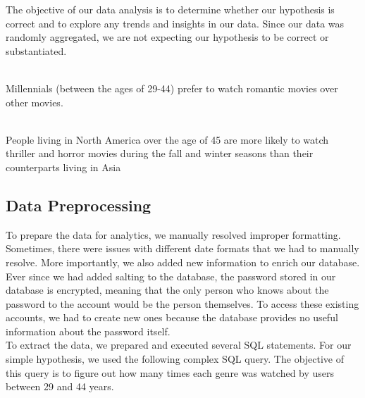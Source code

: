 \documentclass[12pt]{article}
\begin{document}
The objective of our data analysis is to determine whether our hypothesis is correct and to explore any trends and insights in our data. Since our data was randomly aggregated, we are not expecting our hypothesis to be correct or substantiated.\\
\\

Millennials (between the ages of 29-44) prefer to watch romantic movies over other movies.\\
\\

People living in North America over the age of 45 are more likely to watch thriller and horror movies during the fall and winter seasons than their counterparts living in Asia

\subsection{Data Preprocessing}

To prepare the data for analytics, we manually resolved improper formatting. Sometimes, there were issues with different date formats that we had to manually resolve. More importantly, we also added new information to enrich our database. Ever since we had added salting to the database, the password stored in our database is encrypted, meaning that the only person who knows about the password to the account would be the person themselves. To access these existing accounts, we had to create new ones because the database provides no useful information about the password itself.\\

To extract the data, we prepared and executed several SQL statements. For our simple hypothesis, we used the following complex SQL query. The objective of this query is to figure out how many times each genre was watched by users between 29 and 44 years.\\
\end{document}
